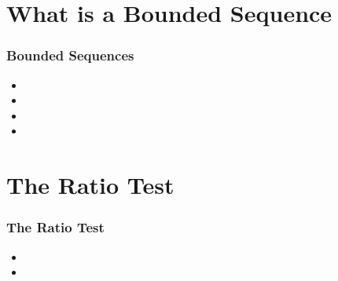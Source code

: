 
\section{What is a Bounded Sequence}



\begin{frame}
\frametitle{Bounded Sequences}

\begin{itemize}
\item
\item
\item
\item
\end{itemize}

\end{frame}

\section{The Ratio Test}
\begin{frame}
\frametitle{The Ratio Test}
\begin{itemize}
\item
\item
\end{itemize}
\end{frame}

